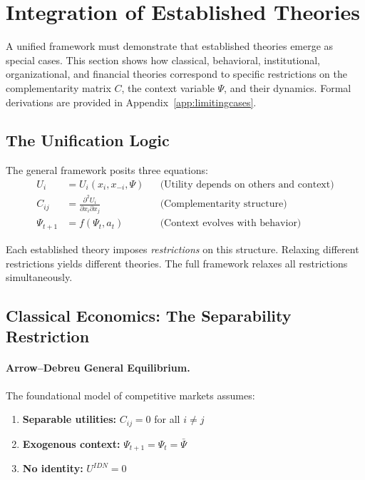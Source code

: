 \section{Integration of Established Theories}
\label{sec:integration}

A unified framework must demonstrate that established theories emerge as special cases.
This section shows how classical, behavioral, institutional, organizational, and financial 
theories correspond to specific restrictions on the complementarity matrix $C$, 
the context variable $\Psi$, and their dynamics.
Formal derivations are provided in Appendix~\ref{app:limitingcases}.

\subsection{The Unification Logic}

The general framework posits three equations:
\begin{align}
  U_i &= U_i(x_i, x_{-i}, \Psi) && \text{(Utility depends on others and context)} \\
  C_{ij} &= \frac{\partial^2 U_i}{\partial x_i \partial x_j} && \text{(Complementarity structure)} \\
  \Psi_{t+1} &= f(\Psi_t, a_t) && \text{(Context evolves with behavior)}
\end{align}

Each established theory imposes \emph{restrictions} on this structure.
Relaxing different restrictions yields different theories.
The full framework relaxes all restrictions simultaneously.

\subsection{Classical Economics: The Separability Restriction}

\paragraph{Arrow--Debreu General Equilibrium.}
The foundational model of competitive markets \citep{arrowdeb} assumes:
\begin{enumerate}
  \item \textbf{Separable utilities:} $C_{ij} = 0$ for all $i \neq j$
  \item \textbf{Exogenous context:} $\Psi_{t+1} = \Psi_t = \bar{\Psi}$
  \item \textbf{No identity:} $U^{IDN} = 0$
\end{enumerate}

